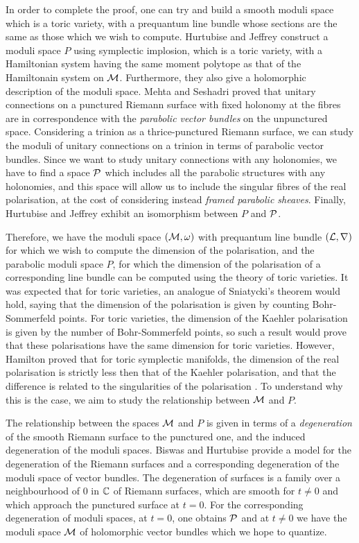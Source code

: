 	In order to complete the proof, one can try and build a smooth moduli space which is a toric variety, with a prequantum line bundle whose sections are the same as those which we wish to compute. Hurtubise and Jeffrey \cite{hurtubise_moduli_2005}\cite{hurtubise_representations_2000} construct a moduli space $P$ using symplectic implosion, which is a toric variety, with a Hamiltonian system having the same moment polytope as that of the Hamiltonain system on $\mathcal{M}$. Furthermore, they also give a holomorphic description of the moduli space. Mehta and Seshadri \cite{mehta_moduli_1980} proved that unitary connections on a punctured Riemann surface with fixed holonomy at the fibres are in correspondence with the \textit{parabolic vector bundles} on the unpunctured space. Considering a trinion as a thrice-punctured Riemann surface, we can study the moduli of unitary connections on a trinion in terms of parabolic vector bundles. Since we want to study unitary connections with any holonomies, we have to find a space $\mathcal{P}$ which includes all the parabolic structures with any holonomies, and this space will allow us to include the singular fibres of the real polarisation, at the cost of considering instead \emph{framed parabolic sheaves}. Finally, Hurtubise and Jeffrey exhibit an isomorphism between $P$ and $\mathcal{P}$.
	
	Therefore, we have the moduli space $(\mathcal{M},\omega)$ with prequantum line bundle $(\mathcal{L},\nabla)$ for which we wish to compute the dimension of the polarisation, and the parabolic moduli space $P$, for which the dimension of the polarisation of a corresponding line bundle can be computed using the theory of toric varieties. It was expected that for toric varieties, an analogue of Sniatycki's theorem would hold, saying that the dimension of the polarisation is given by counting Bohr-Sommerfeld points. For toric varieties, the dimension of the Kaehler polarisation is given by the number of Bohr-Sommerfeld points, so such a result would prove that these polarisations have the same dimension for toric varieties. However, Hamilton proved that for toric symplectic manifolds, the dimension of the real polarisation is strictly less then that of the Kaehler polarisation, and that the difference is related to the singularities of the polarisation \cite{hamilton_locally_2010}. To understand why this is the case, we aim to study the relationship between $\mathcal{M}$ and $P$.
	
	The relationship between the spaces $\mathcal{M}$ and $P$ is given in terms of a \textit{degeneration} of the smooth Riemann surface to the punctured one, and the induced degeneration of the moduli spaces. Biswas and Hurtubise \cite{biswas_degenerations_2021} provide a model for the degeneration of the Riemann surfaces and a corresponding degeneration of the moduli space of vector bundles. The degeneration of surfaces is a family over a neighbourhood of $0$ in $\mathbb{C}$ of Riemann surfaces, which are smooth for $t\neq0$ and which approach the punctured surface at $t=0$. For the corresponding degeneration of moduli spaces, at $t=0$, one obtains $\mathcal{P}$ and at $t\neq 0$ we have the moduli space $\mathcal{M}$ of holomorphic vector bundles which we hope to quantize. 
	

